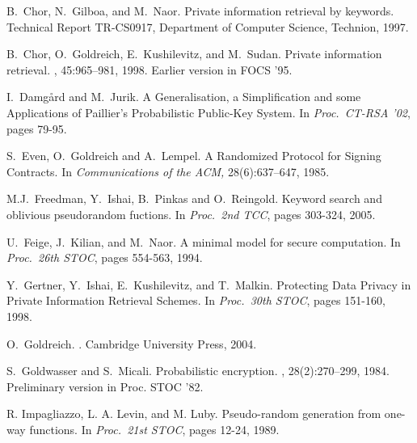 \documentclass[11pt]{article}
\begin{document}
\begin{thebibliography}{10}
B.~Chor, N.~Gilboa, and M.~Naor.
\newblock Private information retrieval by keywords.
\newblock Technical Report TR-CS0917, Department of Computer Science, Technion,
  1997.

B.~Chor, O.~Goldreich, E.~Kushilevitz, and M.~Sudan.
\newblock Private information retrieval.
, 45:965--981, 1998.
\newblock Earlier version in FOCS '95.

I.~Damg{\aa}rd and M.~Jurik.
\newblock A Generalisation, a Simplification and some Applications of Paillier's Probabilistic Public-Key
System.
\newblock In {\em Proc.\ CT-RSA '02}, pages 79-95.

S.~Even, O.~Goldreich and A.~Lempel.
\newblock A Randomized Protocol for Signing Contracts.
\newblock In {\em Communications of the ACM,} 28(6):637--647, 1985.


M.J.~Freedman, Y.~Ishai, B.~Pinkas and O.~Reingold.
\newblock Keyword search and oblivious pseudorandom fuctions.
\newblock In {\em Proc.\ 2nd TCC}, pages 303-324, 2005.

U.~Feige, J.~Kilian, and M.~Naor.
\newblock  A minimal model for secure computation.
\newblock  In {\em Proc.\ 26th STOC}, pages 554-563, 1994.

Y.~Gertner, Y.~Ishai, E.~Kushilevitz, and T.~Malkin.
\newblock Protecting Data Privacy in Private Information Retrieval Schemes.
\newblock In {\em Proc.\ 30th STOC}, pages 151-160, 1998.

O.~Goldreich.
.
\newblock Cambridge University Press, 2004.

S.~Goldwasser and S.~Micali.
\newblock Probabilistic encryption.
, 28(2):270--299, 1984.
\newblock Preliminary version in Proc. STOC '82.


R. Impagliazzo, L. A. Levin, and M. Luby.
\newblock Pseudo-random generation from one-way functions.
\newblock In {\em Proc.\ 21st STOC}, pages 12-24, 1989.



\end{thebibliography}
\end{document}
